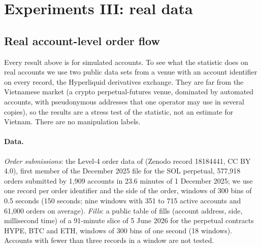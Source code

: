 \section{Experiments III: real data}\label{sec:real}

\subsection{Real account-level order flow}\label{sec:real-accounts}

Every result above is for simulated accounts. To see what the statistic does on real accounts we use two public data sets from a venue with an account identifier on every record, the Hyperliquid derivatives exchange. They are far from the Vietnamese market (a crypto perpetual-futures venue, dominated by automated accounts, with pseudonymous addresses that one operator may use in several copies), so the results are a stress test of the statistic, not an estimate for Vietnam. There are no manipulation labels.

\paragraph{Data.} \emph{Order submissions}: the Level-4 order data of \citet{albers2026} (Zenodo record 18184441, CC BY 4.0), first member of the December 2025 file for the SOL perpetual, 577,918 orders submitted by 1,909 accounts in 23.6 minutes of 1 December 2025; we use one record per order identifier and the side of the order, windows of 300 bins of 0.5 seconds (150 seconds; nine windows with 351 to 715 active accounts and 61,000 orders on average). \emph{Fills}: a public table of fills (account address, side, millisecond time) of a 91-minute slice of 5 June 2026 for the perpetual contracts HYPE, BTC and ETH, windows of 300 bins of one second (18 windows). Accounts with fewer than three records in a window are not tested.

